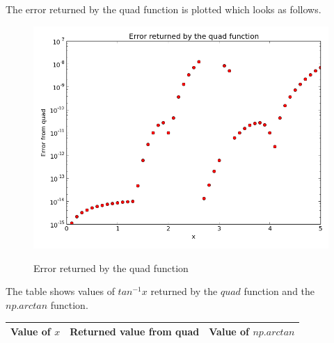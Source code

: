 \documentclass[a4paper, 12pt, margin= 1.25cm ]{article}
\begin{document}
\begin{enumerate}
		The error returned by the quad function is plotted which looks as follows.
		
		\begin{figure}[H]
		\includegraphics[width=\linewidth]{figure2.png}
		\label{fig:figure2}
		\caption{Error returned by the quad function}
		\end{figure}	

		The table shows values of $tan^{-1}x$ returned by the $quad$ function and the $np.arctan$ function.

			\begin{center}
			
				\begin{longtable}{c|r|r}
				\textbf{Value of $x$} & \textbf{Returned value from quad} &\textbf{Value of $np.arctan$}\\
				\hline


\end{longtable}
\end{center}
\end{enumerate}
\end{document}
